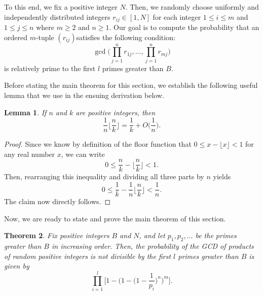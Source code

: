 \documentclass[12pt]{amsart}
\newtheorem{theorem}{Theorem}[subsection]
\newtheorem{lemma}[theorem]{Lemma}
\theoremstyle{definition}
\begin{document}
\vspace{.1 in}

To this end, we fix a positive integer $N$. Then, we randomly choose uniformly and independently distributed  integers $r_{ij} \in [1, N]$ for each integer $1 \leq i \leq m$ and $1 \leq j \leq n$ where $m \geq 2$ and $n \geq 1$. Our goal is to compute the probability that an ordered $m$-tuple $(r_{ij})$satisfies the following condition:
$$\gcd\Big(\prod_{j=1}^nr_{1j}, ..., \prod_{j=1}^n r_{mj}\Big)$$
is relatively prime to the first $l$ primes greater than $B$. 

Before stating the main theorem for this section, we establish the following useful lemma that we use in the ensuing derivation below.

\begin{lemma} If $n$ and $k$ are positive integers, then
	$$\frac{1}{n} \Big\lfloor \frac{n}{k} \Big\rfloor = \frac{1}{k} + O\Big(\frac{1}{n}\Big).$$
\end{lemma}

\begin{proof}
	Since we know by definition of the floor function that $0 \leq x - \lfloor x \rfloor < 1$ for any real number $x$, we can write
	$$0 \leq \frac{n}{k} - \Big\lfloor \frac{n}{k} \Big\rfloor < 1.$$
	Then, rearranging this inequality and dividing all three parts by $n$ yields
	$$0 \leq \frac{1}{k} - \frac{1}{n}\Big\lfloor \frac{n}{k}\Big\rfloor < \frac{1}{n}.$$
	The claim now directly follows.
\end{proof}

Now, we are ready to state and prove the main theorem of this section.

\begin{theorem}
	Fix positive integers $B$ and $N$, and let $p_1, p_2, ...$ be the primes greater than $B$ in increasing order. Then, the probability of the GCD of products of random positive integers is not divisible by the first $l$ primes greater than $B$ is given by \label{probability-random-first-l}
	$$\prod_{i=1}^{l} \Big[1 - \Big(1 - \Big(1-\frac{1}{p_i}\Big)^n\Big)^m\Big].$$
\end{theorem}
\end{document}

